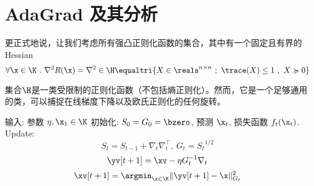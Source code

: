 \section{
    AdaGrad 及其分析
    }


更正式地说，让我们考虑所有强凸正则化函数的集合，其中有一个固定且有界的 Hessian
$$\forall \x \in \K \ . \ \nabla^2 R(\x) = \nabla^2 \in \H \equaltri \{ X \in \reals^{n \times n} \ ; \ \trace(X) \leq 1 \ , \ X \succcurlyeq 0 \}$$ 

集合$\H$是一类受限制的正则化函数（不包括熵正则化）。然而，它是一个足够通用的类，可以捕捉在线梯度下降以及欧氏正则化的任何旋转。

\begin{algorithm}
	[H] \caption{
        AdaGrad (全矩阵版本)
        } \label{alg:adagrad}
	\begin{algorithmic}
		[1] 
        \STATE 输入: 参数 $\eta, \x_1 \in \K$
		\STATE 初始化: $S_0 = G_0 = \bzero $, 
		\STATE 预测 $\x_t$, 损失函数 $f_t(\x_t)$.
		\STATE Update: 
		$$S_t = S_{t-1} + \nabla_t \nabla_t^\top, \ G_t = {S_t}^{1/2}$$
		$$ \yv[t+1] = \xv - \eta G_t^{-1} \nabla_t $$ 
		$$ \xv[t+1] = \argmin_{\x \in \K} \| \yv[t+1]  - \x\|^2_{G_t} $$ 
				\ENDFOR
	\end{algorithmic}
\end{algorithm}


